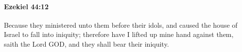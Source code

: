 
		\paragraph{Ezekiel 44:12} %
			\label{EZEKIEL-44-12}

			Because they ministered unto them before their idols, and caused the house of Israel to fall into iniquity; therefore have I lifted up mine hand against them, saith the Lord GOD, and they shall bear their iniquity.


